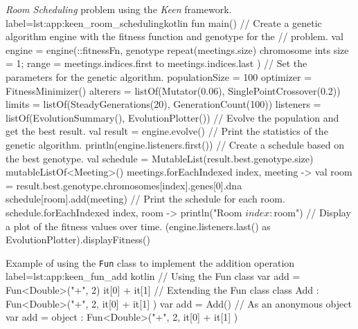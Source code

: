 \begin{code}{
    \textit{Room Scheduling} problem using the \textit{Keen} framework.
  }{label=lst:app:keen_room_scheduling}{kotlin}
    fun main() {
        // Create a genetic algorithm engine with the fitness function and genotype for the 
        // problem.
        val engine = engine(::fitnessFn, genotype {
            repeat(meetings.size) {
                chromosome {
                    ints { size = 1; range = meetings.indices.first to meetings.indices.last }
                }
            }
        }) {
            // Set the parameters for the genetic algorithm.
            populationSize = 100
            optimizer = FitnessMinimizer()
            alterers = listOf(Mutator(0.06), SinglePointCrossover(0.2))
            limits = listOf(SteadyGenerations(20), GenerationCount(100))
            listeners = listOf(EvolutionSummary(), EvolutionPlotter())
        }
        // Evolve the population and get the best result.
        val result = engine.evolve()
        // Print the statistics of the genetic algorithm.
        println(engine.listeners.first())
        // Create a schedule based on the best genotype.
        val schedule = MutableList(result.best.genotype.size) { mutableListOf<Meeting>() }
        meetings.forEachIndexed { index, meeting ->
            val room = result.best.genotype.chromosomes[index].genes[0].dna
            schedule[room].add(meeting)
        }
        // Print the schedule for each room.
        schedule.forEachIndexed { index, room ->
            println("Room $index: $room")
        }
        // Display a plot of the fitness values over time.
        (engine.listeners.last() as EvolutionPlotter).displayFitness()
    }
  \end{code}

  \begin{code}{
    Example of using the \texttt{Fun} class to implement the addition 
    operation
  }{
    label=lst:app:keen_fun_add
  }{kotlin}
    // Using the Fun class
    var add = Fun<Double>("+", 2) { it[0] + it[1] }
    // Extending the Fun class
    class Add : Fun<Double>("+", 2, { it[0] + it[1] })
    var add = Add()
    // As an anonymous object
    var add = object : Fun<Double>("+", 2, { it[0] + it[1] }) {}
  \end{code}